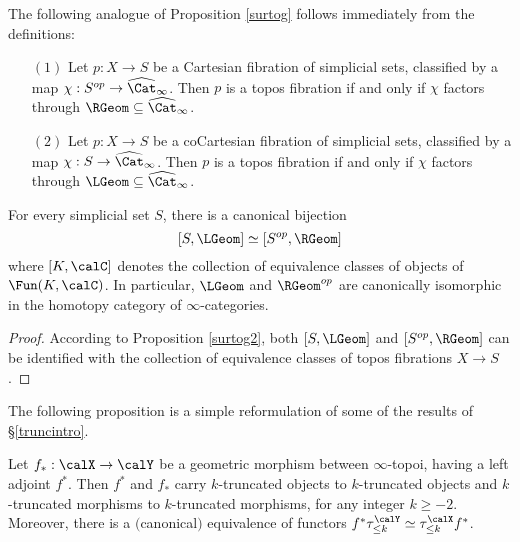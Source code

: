 The following analogue of Proposition \ref{surtog} follows immediately from the definitions:

\begin{proposition}\label{surtog2}
\begin{itemize}
\item[$(1)$] Let $p: X \rightarrow S$ be a Cartesian fibration of simplicial sets, classified
by a map $\chi: S^{op} \rightarrow \widehat{\Cat}_{\infty}$. Then $p$ is a topos fibration if and only if $\chi$ factors through $\RGeom \subseteq \widehat{\Cat}_{\infty}$. 

\item[$(2)$] Let $p: X \rightarrow S$ be a coCartesian fibration of simplicial sets, classified by a map $\chi: S \rightarrow \widehat{\Cat}_{\infty}$. Then $p$ is a topos fibration if and only if
$\chi$ factors through $\LGeom \subseteq \widehat{\Cat}_{\infty}$.
\end{itemize}
\end{proposition}

\begin{corollary}\label{suytoy}
For every simplicial set $S$, there is a canonical bijection
$$ [ S, \LGeom ] \simeq [ S^{op}, \RGeom ]$$
where $[K, \calC]$ denotes the collection of equivalence classes of objects of $\Fun(K,\calC)$.
In particular, $\LGeom$ and $\RGeom^{op}$ are canonically isomorphic
in the homotopy category of $\infty$-categories.
\end{corollary}

\begin{proof}
According to Proposition \ref{surtog2}, both $[S, \LGeom]$ and $[S^{op}, \RGeom]$ can be identified with the collection of equivalence classes of topos fibrations $X \rightarrow S$.
\end{proof}

The following proposition is a simple reformulation of some of the results of \S \ref{truncintro}.

\begin{proposition}
Let $f_{\ast}: \calX \rightarrow \calY$ be a geometric morphism between $\infty$-topoi, having a left adjoint $f^{\ast}$. Then $f^{\ast}$ and
$f_{\ast}$ carry $k$-truncated objects to $k$-truncated objects and $k$-truncated morphisms to $k$-truncated morphisms, for any integer $k \geq -2$. Moreover, there is a $($canonical$)$ equivalence
of functors $f^{\ast} \tau^{\calY}_{\leq k} \simeq \tau^{\calX}_{\leq k} f^{\ast}$.
\end{proposition}

